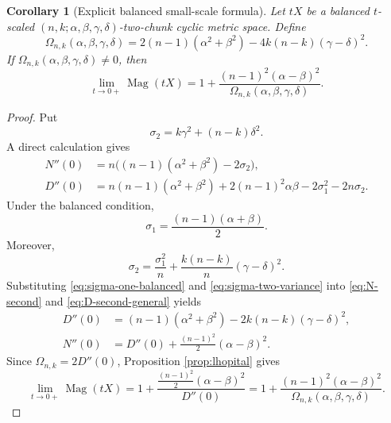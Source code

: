 \documentclass[11pt]{amsart}
\numberwithin{equation}{section}
\newtheorem{corollary}[theorem]{Corollary}
\theoremstyle{definition}
\theoremstyle{remark}
\DeclareMathOperator{\Mag}{Mag}
\begin{document}
\begin{corollary}[Explicit balanced small-scale formula]\label{cor:one-plus-formula}
Let \(tX\) be a balanced \(t\)-scaled \((n,k;\alpha,\beta,\gamma,\delta)\)-two-chunk cyclic metric space.  Define
\begin{equation}\label{eq:Omega-definition}
\Omega_{n,k}(\alpha,\beta,\gamma,\delta)
=2(n-1)(\alpha^2+\beta^2)-4k(n-k)(\gamma-\delta)^2.
\end{equation}
If \(\Omega_{n,k}(\alpha,\beta,\gamma,\delta)\neq 0\), then
\begin{equation}\label{eq:one-plus-formula}
\lim_{t\to 0+}\Mag(tX)
=
1+\frac{(n-1)^2(\alpha-\beta)^2}
{\Omega_{n,k}(\alpha,\beta,\gamma,\delta)}.
\end{equation}
\end{corollary}

\begin{proof}
Put
\begin{equation}\label{eq:sigma-two}
\sigma_2=k\gamma^2+(n-k)\delta^2.
\end{equation}
A direct calculation gives
\begin{align}
N''(0)&=n\bigl((n-1)(\alpha^2+\beta^2)-2\sigma_2\bigr),
\label{eq:N-second}\\
D''(0)&=n(n-1)(\alpha^2+\beta^2)+2(n-1)^2\alpha\beta
-2\sigma_1^2-2n\sigma_2.
\label{eq:D-second-general}
\end{align}
Under the balanced condition,
\begin{equation}\label{eq:sigma-one-balanced}
\sigma_1=\frac{(n-1)(\alpha+\beta)}{2}.
\end{equation}
Moreover,
\begin{equation}\label{eq:sigma-two-variance}
\sigma_2=\frac{\sigma_1^2}{n}+\frac{k(n-k)}{n}(\gamma-\delta)^2.
\end{equation}
Substituting \eqref{eq:sigma-one-balanced} and \eqref{eq:sigma-two-variance} into \eqref{eq:N-second} and \eqref{eq:D-second-general} yields
\begin{align}
D''(0)&=(n-1)(\alpha^2+\beta^2)-2k(n-k)(\gamma-\delta)^2,
\label{eq:D-second-simplified}\\
N''(0)&=D''(0)+\frac{(n-1)^2}{2}(\alpha-\beta)^2.
\label{eq:N-D-second-relation}
\end{align}
Since \(\Omega_{n,k}=2D''(0)\), Proposition \ref{prop:lhopital} gives
\begin{equation}\label{eq:one-plus-proof}
\lim_{t\to 0+}\Mag(tX)
=1+\frac{\frac{(n-1)^2}{2}(\alpha-\beta)^2}{D''(0)}
=1+\frac{(n-1)^2(\alpha-\beta)^2}{\Omega_{n,k}(\alpha,\beta,\gamma,\delta)}.
\end{equation}
\end{proof}
\end{document}

